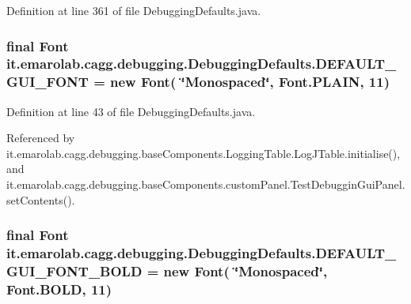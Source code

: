 Definition at line 361 of file Debugging\-Defaults.\-java.

\hypertarget{classit_1_1emarolab_1_1cagg_1_1debugging_1_1DebuggingDefaults_a5f2a7c7991c040d770f864911e79e7ea}{
\subsubsection[{D\-E\-F\-A\-U\-L\-T\-\_\-\-G\-U\-I\-\_\-\-F\-O\-N\-T}]{\setlength{\rightskip}{0pt plus 5cm}final Font it.\-emarolab.\-cagg.\-debugging.\-Debugging\-Defaults.\-D\-E\-F\-A\-U\-L\-T\-\_\-\-G\-U\-I\-\_\-\-F\-O\-N\-T = new Font( \char`\"{}Monospaced\char`\"{}, Font.\-P\-L\-A\-I\-N, 11)\hspace{0.3cm}{\ttfamily [static]}}}\label{classit_1_1emarolab_1_1cagg_1_1debugging_1_1DebuggingDefaults_a5f2a7c7991c040d770f864911e79e7ea}


Definition at line 43 of file Debugging\-Defaults.\-java.



Referenced by it.\-emarolab.\-cagg.\-debugging.\-base\-Components.\-Logging\-Table.\-Log\-J\-Table.\-initialise(), and it.\-emarolab.\-cagg.\-debugging.\-base\-Components.\-custom\-Panel.\-Test\-Debuggin\-Gui\-Panel.\-set\-Contents().

\hypertarget{classit_1_1emarolab_1_1cagg_1_1debugging_1_1DebuggingDefaults_a1ab0f7cb1f7895f130858530c0eb9443}{
\subsubsection[{D\-E\-F\-A\-U\-L\-T\-\_\-\-G\-U\-I\-\_\-\-F\-O\-N\-T\-\_\-\-B\-O\-L\-D}]{\setlength{\rightskip}{0pt plus 5cm}final Font it.\-emarolab.\-cagg.\-debugging.\-Debugging\-Defaults.\-D\-E\-F\-A\-U\-L\-T\-\_\-\-G\-U\-I\-\_\-\-F\-O\-N\-T\-\_\-\-B\-O\-L\-D = new Font( \char`\"{}Monospaced\char`\"{}, Font.\-B\-O\-L\-D, 11)\hspace{0.3cm}{\ttfamily [static]}}}\label{classit_1_1emarolab_1_1cagg_1_1debugging_1_1DebuggingDefaults_a1ab0f7cb1f7895f130858530c0eb9443}


